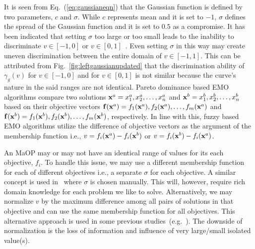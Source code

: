 \documentclass[review]{elsarticle}
\begin{document}
It is seen from Eq.~(\ref{eq:gaussianeqn}) that the Gaussian function is defined by two parameters, $c$ and $\sigma$. 
While $c$ represents mean and it is set to $-1$, $\sigma$ defines the spread of the Gaussian function and  it is set to $0.5$ as a compromise. It has been indicated that setting $\sigma$ too large or too small leads to the inability to discriminate $v\in [-1, 0]$  
or $v \in [0, 1]$~\citep{he2014fuzzy}. Even setting $\sigma$ in this way may create uneven discrimination between the entire domain of $v\in [-1, 1]$. This can be attributed from Fig.~\ref{fig:leftgaussianupdated} that the discrimination ability of $\gamma_g(v)$ for $v\in [-1, 0]$ and for $v \in [0, 1]$ is not similar because the curve's nature in the said ranges are not identical.
Pareto dominance based EMO algorithms compare two solutions ${\bf x}^a = x^a_1, x^a_2, \ldots, x^a_n$  and ${\bf x}^b = x^b_1,x^b_2, \ldots, x^b_n$  based on their objective vectors ${\bf f}({\bf x}^a) = f_1({\bf x}^a), f_2({\bf x}^a), \ldots, f_m({\bf x}^a)$ and ${\bf f}({\bf x}^b) = f_1({\bf x}^b), f_2({\bf x}^b), \ldots, f_m({\bf x}^b)$, respectively. In line with this, fuzzy based  EMO algorithms utilize the difference of  objective vectors as the argument of the membership function i.e., $v = f_i({\bf x}^a) - f_i({\bf x}^b)$ or $v = f_i({\bf x}^b) - f_i({\bf x}^a)$.

An MaOP may or may not have an identical range of values for its each objective, 
$f_i$. To handle this issue, we may use a different membership function for each of 
different objectives i.e.,  a separate $\sigma$ for each objective. A similar concept is used in~\citep{farina2004fuzzy} where $\sigma$ is chosen manually.
 This will, however, require rich domain knowledge for each problem we like to solve.
Alternatively, we may normalize $v$ by the maximum difference among all pairs of solutions in that 
objective and can use the same membership function for all objectives. This alternative approach is used in some previous studies~(e.g.~\citep{he2014fuzzy}). The downside of normalization is the loss of information and influence of very large/small isolated value(s).
\end{document}

